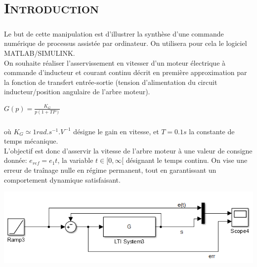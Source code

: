 \chapter*{\textsc{Introduction}}

	\paragraph{} Le but de cette manipulation est d'illustrer la synthèse d'une commande numérique de processus assistée par ordinateur. On utilisera pour cela le logiciel MATLAB/SIMULINK.\\
	On souhaite réaliser l'asservissement en vitesser d'un moteur électrique à commande d'inducteur et courant continu décrit en première approximation par la fonction de transfert entrée-sortie (tension d'alimentation du circuit inducteur/position angulaire de l'arbre moteur).
	\begin{center}
		$ G(p) =\frac{K_G}{p(1+TP)} $
	\end{center}

\paragraph{} où $ K_G \simeq 1 rad . s^{-1} . V^{-1}   $  désigne le gain en vitesse, et $T= 0.1 s $ la constante de temps mécanique.\\
L'objectif est donc d'asservir la vitesse de l'arbre moteur à une valeur de consigne donnée: $e_{ref} = e_1 t$, la variable $ t \in [0,\infty [$ désignant le temps continu. On vise une erreur de traînage nulle en régime permanent, tout en garantissant un comportement dynamique satisfaisant.  

	
	\begin{center}
	\includegraphics[scale=0.5]{sim1.png}
	\label{fig1} 
	\end{center}   